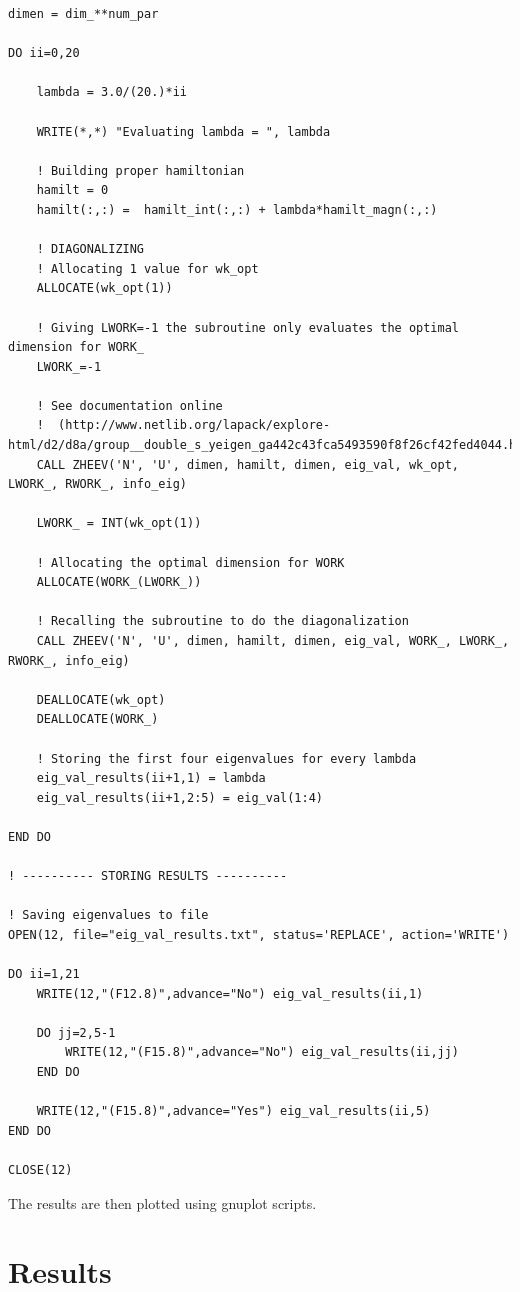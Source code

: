 \documentclass[12pt, a4paper, notitlepage]{report}
\begin{document}
\begin{lstlisting}
dimen = dim_**num_par

DO ii=0,20
	
	lambda = 3.0/(20.)*ii
	
	WRITE(*,*) "Evaluating lambda = ", lambda
	
	! Building proper hamiltonian
	hamilt = 0
	hamilt(:,:) =  hamilt_int(:,:) + lambda*hamilt_magn(:,:)
	
	! DIAGONALIZING
	! Allocating 1 value for wk_opt
	ALLOCATE(wk_opt(1))
	
	! Giving LWORK=-1 the subroutine only evaluates the optimal dimension for WORK_
	LWORK_=-1
	
	! See documentation online
	!  (http://www.netlib.org/lapack/explore-html/d2/d8a/group__double_s_yeigen_ga442c43fca5493590f8f26cf42fed4044.html) 
	CALL ZHEEV('N', 'U', dimen, hamilt, dimen, eig_val, wk_opt, LWORK_, RWORK_, info_eig)
	
	LWORK_ = INT(wk_opt(1))
	
	! Allocating the optimal dimension for WORK
	ALLOCATE(WORK_(LWORK_))
	
	! Recalling the subroutine to do the diagonalization	
	CALL ZHEEV('N', 'U', dimen, hamilt, dimen, eig_val, WORK_, LWORK_, RWORK_, info_eig)
	
	DEALLOCATE(wk_opt)
	DEALLOCATE(WORK_)
	
	! Storing the first four eigenvalues for every lambda
	eig_val_results(ii+1,1) = lambda
	eig_val_results(ii+1,2:5) = eig_val(1:4)

END DO

! ---------- STORING RESULTS ----------

! Saving eigenvalues to file
OPEN(12, file="eig_val_results.txt", status='REPLACE', action='WRITE')

DO ii=1,21
	WRITE(12,"(F12.8)",advance="No") eig_val_results(ii,1)
	
	DO jj=2,5-1
		WRITE(12,"(F15.8)",advance="No") eig_val_results(ii,jj)
	END DO
	
	WRITE(12,"(F15.8)",advance="Yes") eig_val_results(ii,5)
END DO

CLOSE(12)
\end{lstlisting}

The results are then plotted using gnuplot scripts.

\section*{Results}
\end{document}
